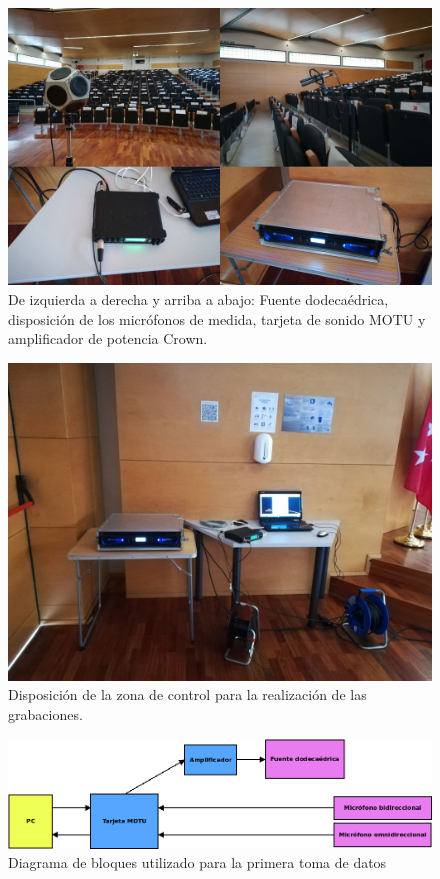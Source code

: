 \documentclass[11pt,a4paper]{book}
\begin{document}
	        \begin{figure}[H]
	            \includegraphics[scale=0.6]{../imagenes/equipos.jpg}
			    \centering
			    \caption{De izquierda a derecha y arriba a abajo: Fuente dodecaédrica, disposición de los micrófonos de medida, tarjeta de sonido MOTU y amplificador de potencia Crown.}
			    \label{fig:equipos}
	        \end{figure}
	    
	        \begin{figure}[H]
	            \includegraphics[scale=0.4]{../imagenes/control.jpg}
			    \centering
			    \caption{Disposición de la zona de control para la realización de las grabaciones.}
			    \label{fig:control}
	        \end{figure}
	        
	        \begin{figure}[H]
	            \includegraphics[scale=0.5]{../imagenes/diagrama_bloques1.png}
			    \centering
			    \caption{Diagrama de bloques utilizado para la primera toma de datos}
			    \label{fig:bloques1}
	        \end{figure}
	    
\end{document}
